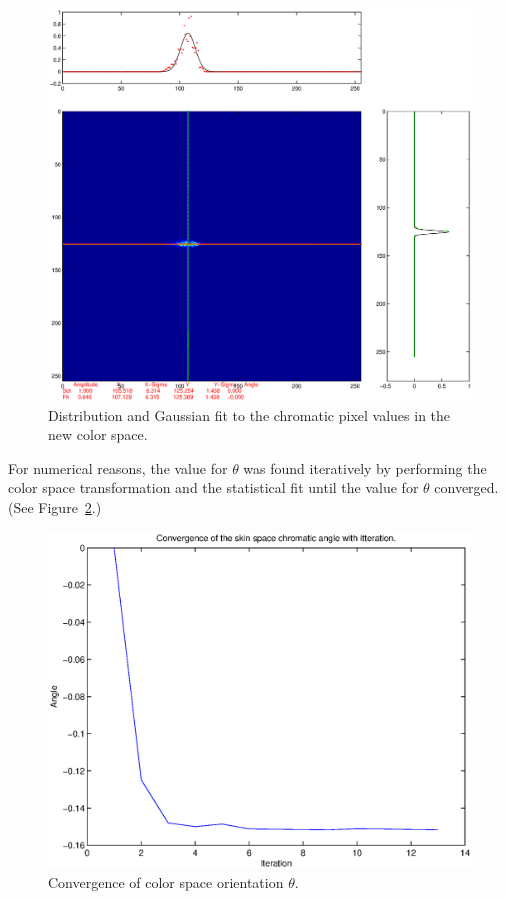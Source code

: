 \documentclass[10pt,a4paper]{article}
\begin{document}
\begin{figure}[h!]
  \caption{Distribution and Gaussian fit to the chromatic pixel values in the new color space.}
  \label{fig:DistributionAndGaussianFit}
  \centering
    \includegraphics[width=\textwidth]{crosshairFigureFinal.eps}
\end{figure}


For numerical reasons, the value for $\theta$ was found iteratively by performing the color space transformation and the statistical fit until the value for $\theta$ converged. (See Figure~\ref{fig:ConvergenceTheta}.)


\begin{figure}[h!]
  \caption{Convergence of color space orientation $\theta$.}
  \label{fig:ConvergenceTheta}
  \centering
    \includegraphics[width=\textwidth]{ConvergenceOfSkinSpaceFinal.eps}
\end{figure}
\end{document}
